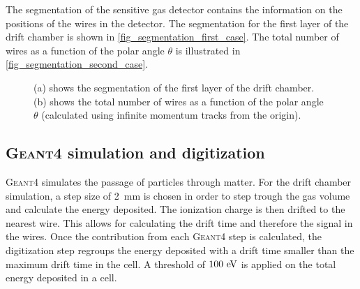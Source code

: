 \documentclass{article}
\begin{document}
The segmentation of the sensitive gas detector contains the information on the positions of the wires in the detector. The segmentation for the first layer of the drift chamber is shown in \cref{fig_segmentation_first_case}. The total number of wires as a function of the polar angle $\theta$ is illustrated in \cref{fig_segmentation_second_case}.

\begin{figure}[!h]
\centering
{}
\hfil
{}
\caption{(a) shows the segmentation of the first layer of the drift chamber. (b) shows the total number of wires as a function of the polar angle $\theta$ (calculated using infinite momentum tracks from the origin).}
\label{fig_segmentation}
\end{figure}


\subsection{\textsc{Geant4} simulation and digitization}
\textsc{Geant4} simulates the passage of particles through matter. For the drift chamber simulation, a step size of 2~mm is chosen in order to step trough the gas volume and calculate the energy deposited. The ionization charge is then drifted to the nearest wire. This allows for calculating the drift time and therefore the signal in the wires. Once the contribution from each \textsc{Geant4} step is calculated, the digitization step regroups the energy deposited with a drift time smaller than the maximum drift time in the cell. A threshold of $100\,\mathrm{\,e\kern -0.1em V}$ is applied on the total energy deposited in a cell.
\end{document}

